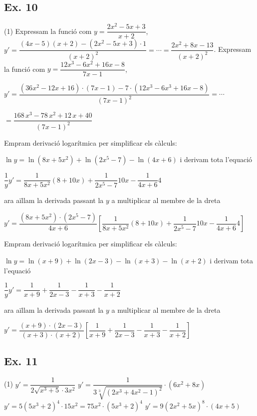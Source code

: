 \documentclass[a4paper, 11pt]{book}
\begin{document}
\subsection*{Ex. 10}

\begin{tasks}(1)
	\task Expressam la funció com $y=\dfrac{2x^2-5x+3}{x+2}$,  $y'=\dfrac{(4x-5)(x+2)-(2x^2-5x+3)\cdot 1}{(x+2)^2}=\cdots=\dfrac{2x^2+8x-13}{(x+2)^2}$.
	\task Expressam la funció com $y=\dfrac{12x^3-6x^2+16x-8}{7x-1}$, 
	
	 $y'=\dfrac{(36x^2-12x+16)\cdot(7x-1)-7\cdot(12x^3-6x^3+16x-8)}{(7x-1)^2}=\cdots$
	 
	 $=\dfrac{168\,x^3-78\,x^2+12\,x+40}{(7x-1)^2}$
	 
	 
	 \task Empram derivació logarítmica per simplificar els càlculs:
	 
	
	 $\ln y = \ln(8x+5x^2) + \ln(2x^5-7) - \ln(4x+6)$ i derivam tota l'equació
	 
	 $\dfrac{1}{y} y' = \dfrac{1}{8x+5x^2} (8+10x) + \dfrac{1}{2x^5-7} 10 x - \dfrac{1}{4x+6} 4$ 
	 
	 ara aïllam la derivada passant la $y$ a multiplicar al membre de la dreta
	 
	 $ y' = \dfrac{(8x+5x^2)\cdot(2x^5-7)}{4x+6} \left[ \dfrac{1}{8x+5x^2} (8+10x) + \dfrac{1}{2x^5-7} 10 x - \dfrac{1}{4x+6} 4 \right]$ 
	 
	 
	 \task Empram derivació logarítmica per simplificar els càlculs:
	 
	 
	 $\ln y = \ln(x+9) + \ln(2x-3) - \ln(x+3) - \ln(x+2)$ i derivam tota l'equació
	 
	 $\dfrac{1}{y} y' = \dfrac{1}{x+9}+ \dfrac{1}{2x-3} - \dfrac{1}{x+3} - \dfrac{1}{x+2}$ 
	 
	 ara aïllam la derivada passant la $y$ a multiplicar al membre de la dreta
	 
	 $ y' = \dfrac{(x+9)\cdot(2x-3)}{(x+3)\cdot (x+2)} \left[  \dfrac{1}{x+9}+ \dfrac{1}{2x-3} - \dfrac{1}{x+3} - \dfrac{1}{x+2} \right]$ 
 
\end{tasks}	


\subsection*{Ex. 11}

\begin{tasks}(1)
	\task  $y'=\dfrac{1}{2\sqrt{x^3+5}\cdot 3x^2}$
	\task  $y'=\dfrac{1}{3\sqrt[3]{(2x^3+4x^2-1)^2}}\cdot (6x^2+8x)$
	\task  $y'= 5(5x^3+2)^4 \cdot 15x^2 =75x^2 \cdot (5x^3+2)^4$
	\task  $y'=9 (2x^2+5x)^8 \cdot (4x+5)$
\end{tasks}	
\end{document}
